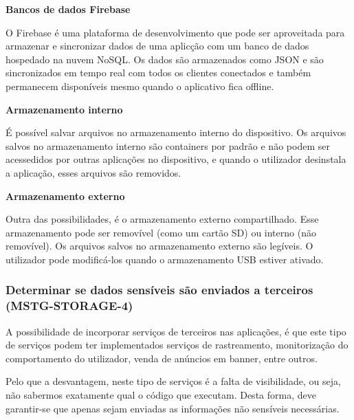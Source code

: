 \hfill\par
\textbf{Bancos de dados Firebase}\par
\hfill\par
\par O Firebase é uma plataforma de desenvolvimento que pode ser aproveitada para armazenar e sincronizar dados de uma aplicção com um banco de dados hospedado na nuvem NoSQL. Os dados são armazenados como JSON e são sincronizados em tempo real com todos os clientes conectados e também permanecem disponíveis mesmo quando o aplicativo fica offline.
\\
\par \textbf{Armazenamento interno}
\par É possível salvar arquivos no armazenamento interno do dispositivo. Os arquivos salvos no armazenamento interno são containers por padrão e não podem ser acessedidos por outras aplicações no dispositivo, e quando o utilizador desinstala a aplicação, esses arquivos são removidos.
\\
\par \textbf{Armazenamento externo}
\par Outra das possibilidades, é o armazenamento externo compartilhado. Esse armazenamento pode ser removível (como um cartão SD) ou interno (não removível). Os arquivos salvos no armazenamento externo são legíveis. O utilizador pode modificá-los quando o armazenamento USB estiver ativado.



\subsubsection{Determinar se dados sensíveis são enviados a terceiros (MSTG-STORAGE-4)}\par
\hfill\par
\hfill\par
\par A possibilidade de incorporar serviços de terceiros nas aplicações, é que este tipo de serviços podem ter implementados serviços de rastreamento, monitorização do comportamento do utilizador, venda de anúncios em banner, entre outros.
\par Pelo que a desvantagem, neste tipo de serviços é a falta de visibilidade, ou seja, não sabermos exatamente qual o código que executam. Desta forma, deve garantir-se que apenas sejam enviadas as informações não sensíveis necessárias.


